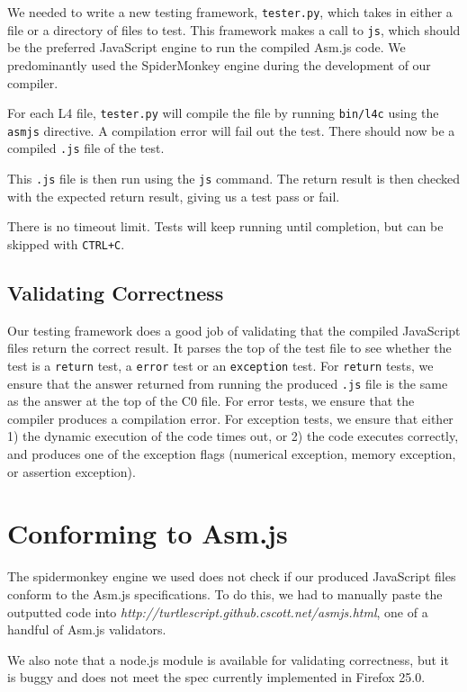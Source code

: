 \documentclass[twoside]{article}
\begin{document}
\begin{multicols}{2}
We needed to write a new testing framework, \texttt{tester.py}, which takes in either a
file or a directory of files to test. This framework makes a call to \texttt{js},
which should be the preferred JavaScript engine to run the compiled Asm.js code.
We predominantly used the SpiderMonkey engine during the development of our
compiler.

For each L4 file, \texttt{tester.py} will compile the file by running \texttt{bin/l4c} 
using the \texttt{asmjs} directive. A compilation error will fail out the test. There 
should now be a compiled \texttt{.js} file of the test.

This \texttt{.js} file is then run using the \texttt{js} command. The return
result is then checked with the expected return result, giving us a test pass
or fail.

There is no timeout limit. Tests will keep running until completion, but can be
skipped with \texttt{CTRL+C}.

\subsection{Validating Correctness}

Our testing framework does a good job of validating that the compiled JavaScript
files return the correct result. It parses the top of the test file to see whether
the test is a \texttt{return} test, a \texttt{error} test or an \texttt{exception} 
test. For \texttt{return} tests, we ensure that the answer returned from running 
the produced \texttt{.js} file is the same as the answer at the top of the C0 file.
For error tests, we ensure that the compiler produces a compilation error. For 
exception tests, we ensure that either 1) the dynamic execution of the code times
out, or 2) the code executes correctly, and produces one of the exception flags
(numerical exception, memory exception, or assertion exception). 


\section{Conforming to Asm.js}
The spidermonkey engine we used does not check if our produced JavaScript files
conform to the Asm.js specifications. To do this, we had to manually paste the
outputted code into \emph{http://turtlescript.github.cscott.net/asmjs.html}, one of a 
handful of Asm.js validators. 

We also note that a node.js module is available for validating correctness, 
but it is buggy and does not meet the spec currently implemented in Firefox 25.0.


\end{multicols}
\end{document}
